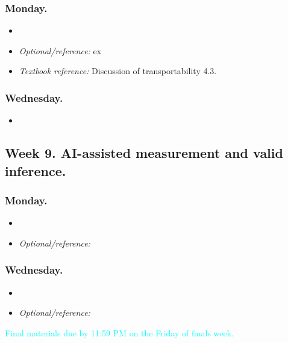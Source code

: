 \documentclass[letterpaper, 12pt, parskip=full,DIV=10]{scrartcl}
\newcommand{\plscbibpath}{assets/PLSC40601}
\renewcommand{\plscbibpath}{../assets/PLSC40601}%
\begin{document}
\subsubsection*{Monday.}
\begin{itemize}
\item {}
\item \textit{Optional/reference:}  ex
\item \textit{Textbook reference:}  Discussion of transportability 4.3. 
\end{itemize}

\subsubsection*{Wednesday.}
\begin{itemize}
\item {}
\end{itemize}

\subsection*{Week 9. AI-assisted measurement and valid inference.}

\subsubsection*{Monday.}
\begin{itemize}
\item {}
\item \textit{Optional/reference:} 
\end{itemize}

\subsubsection*{Wednesday.}
\begin{itemize}
\item {}
\item \textit{Optional/reference:} 
\end{itemize}

\textcolor{cyan}{Final materials due by 11:59 PM on the Friday of finals week.}


\end{document}
